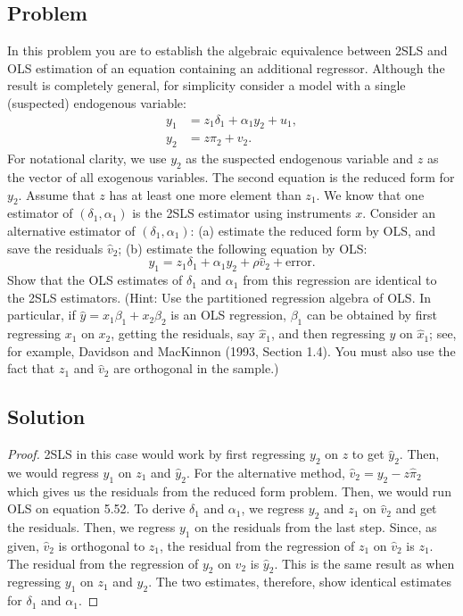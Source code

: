 \documentclass[10pt, a4paper]{article}
\begin{document}
  \subsection*{Problem}
    In this problem you are to establish the algebraic equivalence between 2SLS and OLS estimation of an equation containing an additional regressor. Although the result is completely general, for simplicity consider a model with a single (suspected) endogenous variable:
    \begin{align*}
    y_1 &= z_1\delta_1 + \alpha_1 y_2 + u_1, \\
    y_2 &= z\pi_2 + v_2.
    \end{align*}
    For notational clarity, we use $y_2$ as the suspected endogenous variable and $z$ as the vector of all exogenous variables. The second equation is the reduced form for $y_2$.
    Assume that $z$ has at least one more element than $z_1$.
    We know that one estimator of $(\delta_1, \alpha_1)$ is the 2SLS estimator using instruments $x$. Consider an alternative estimator of $(\delta_1, \alpha_1)$:
    (a) estimate the reduced form by OLS, and save the residuals $\hat{v}_2$;
    (b) estimate the following equation by OLS:
    \begin{equation}
    y_1 = z_1\delta_1 + \alpha_1 y_2 + \rho\hat{v}_2 + \text{error}. \tag{5.52}
    \end{equation}
    Show that the OLS estimates of $\delta_1$ and $\alpha_1$ from this regression are identical to the 2SLS estimators. (Hint: Use the partitioned regression algebra of OLS. In particular, if $\hat{y} = x_1\beta_1 + x_2\beta_2$ is an OLS regression, $\beta_1$ can be obtained by first regressing $x_1$ on $x_2$, getting the residuals, say $\hat{x}_1$, and then regressing $y$ on $\hat{x}_1$; see, for example, Davidson and MacKinnon (1993, Section 1.4). You must also use the fact that $z_1$ and $\hat{v}_2$ are orthogonal in the sample.)
  \subsection*{Solution}
    \begin{proof}
      2SLS in this case would work by first regressing $y_2$ on $z$ to get $\hat{y}_2$. Then, we would regress $y_1$ on $z_1$ and $\hat{y}_2$. For the alternative method, $\hat{v}_2 = y_2 - z\hat{\pi}_2$ which gives us the residuals from the reduced form problem. Then, we would run OLS on equation 5.52. To derive $\delta_1$ and $\alpha_1$, we regress $y_2$ and $z_1$ on $\hat{v}_2$ and get the residuals. Then, we regress $y_1$ on the residuals from the last step. Since, as given, $\hat{v}_2$ is orthogonal to $z_1$, the residual from the regression of $z_1$ on $\hat{v}_2$ is $z_1$. The residual from the regression of $y_2$ on $\hat{v}_2$ is $\hat{y}_2$. This is the same result as when regressing $y_1$ on $z_1$ and $\hat{y}_2$. The two estimates, therefore, show identical estimates for $\delta_1$ and $\alpha_1$. 
    \end{proof}
\end{document}
